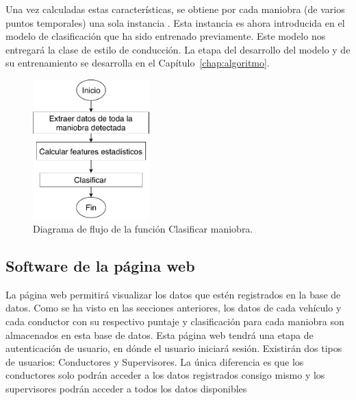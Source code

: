 Una vez calculadas estas características, se obtiene por cada maniobra (de varios puntos temporales) una sola instancia . Esta instancia es ahora introducida en el modelo de clasificación que ha sido entrenado previamente. Este modelo nos entregará la clase de estilo de conducción. La etapa del desarrollo del modelo y de su entrenamiento se desarrolla en el Capítulo~\ref{chap:algoritmo}.


\begin{figure}[hbt!]
\centering
\includegraphics[width=0.4\textwidth]{Flujo_servidor_clasificar.pdf}
\caption{Diagrama de flujo de la función Clasificar maniobra.}
\label{fig:Flujo_servidor_clasificar}
\end{figure}


\subsection{Software de la página web}

La página web permitirá visualizar los datos que estén registrados en la base de datos. Como se ha visto en las secciones anteriores, los datos de cada vehículo y cada conductor con su respectivo puntaje y clasificación para cada maniobra son almacenados en esta base de datos. Esta página web tendrá una etapa de autenticación de usuario, en dónde el usuario iniciará sesión. Existirán dos tipos de usuarios: Conductores y Supervisores. La única diferencia es que los conductores solo podrán acceder a los datos registrados consigo mismo y los supervisores podrán acceder a todos los datos disponibles





















